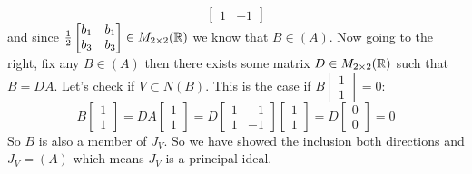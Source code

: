 \documentclass[11pt]{article}
\begin{document}
{$$\begin{bmatrix}
            1 & -1
        \end{bmatrix}
        $$
        and since
        $
        \frac{1}{2}
        \begin{bmatrix}
            b_1 & b_1 \\
            b_3 & b_3
        \end{bmatrix}
        \in M_{2 \times 2} (\mathbb{R})$
        we know that $B \in (A)$. \parspace
        Now going to the right, fix any $B \in (A)$ then there exists some matrix $D \in M_{2 \times 2} (\mathbb{R})$ such that $B = DA$.
        Let's check if $V \subset N(B)$.
        This is the case if $B \begin{bmatrix} 1 \\ 1 \end{bmatrix} = 0$:
        $$
        B \begin{bmatrix} 1 \\ 1 \end{bmatrix}
        =
        DA \begin{bmatrix} 1 \\ 1 \end{bmatrix}
        = D
        \begin{bmatrix}
            1 & -1 \\
            1 & -1
        \end{bmatrix}
        \begin{bmatrix} 1 \\ 1 \end{bmatrix}
        = D \begin{bmatrix} 0 \\ 0 \end{bmatrix}
        = 0
        $$
        So $B$ is also a member of $J_V$.
        So we have showed the inclusion both directions and $J_V = (A)$ which means $J_V$ is a principal ideal.
    }


\newpage
\end{document}

